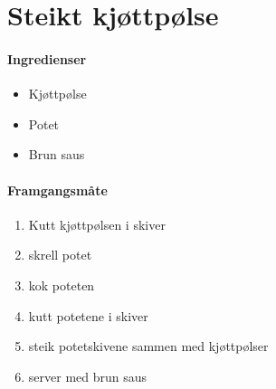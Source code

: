 \section{﻿Steikt kjøttpølse}


\paragraph{Ingredienser}
\begin{itemize}[noitemsep]
	\item Kjøttpølse
	\item Potet
	\item Brun saus
\end{itemize}

\paragraph{Framgangsmåte}
\begin{enumerate}[noitemsep]
	\item Kutt kjøttpølsen i skiver
	\item skrell potet
	\item kok poteten
	\item kutt potetene i skiver
	\item steik potetskivene sammen med kjøttpølser
	\item server med brun saus
\end{enumerate}
